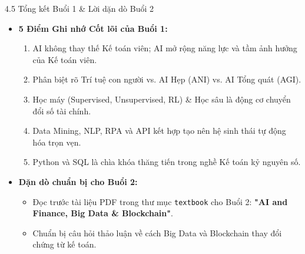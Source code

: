 \documentclass[aspectratio=169]{beamer}
\begin{document}
\begin{frame}{4.5 Tổng kết Buổi 1 \& Lời dặn dò Buổi 2}
    \begin{itemize}
        \item \textbf{5 Điểm Ghi nhớ Cốt lõi của Buổi 1:}
        \begin{enumerate}
            \item AI không thay thế Kế toán viên; AI mở rộng năng lực và tầm ảnh hưởng của Kế toán viên.
            \item Phân biệt rõ Trí tuệ con người vs. AI Hẹp (ANI) vs. AI Tổng quát (AGI).
            \item Học máy (Supervised, Unsupervised, RL) \& Học sâu là động cơ chuyển đổi số tài chính.
            \item Data Mining, NLP, RPA và API kết hợp tạo nên hệ sinh thái tự động hóa trọn vẹn.
            \item Python và SQL là chìa khóa thăng tiến trong nghề Kế toán kỷ nguyên số.
        \end{enumerate}
        \item \textbf{Dặn dò chuẩn bị cho Buổi 2:}
        \begin{itemize}
            \item Đọc trước tài liệu PDF trong thư mục \texttt{textbook} cho Buổi 2: \textbf{"AI and Finance, Big Data \& Blockchain"}.
            \item Chuẩn bị câu hỏi thảo luận về cách Big Data và Blockchain thay đổi chứng từ kế toán.
        \end{itemize}
    \end{itemize}
\end{frame}
\end{document}

